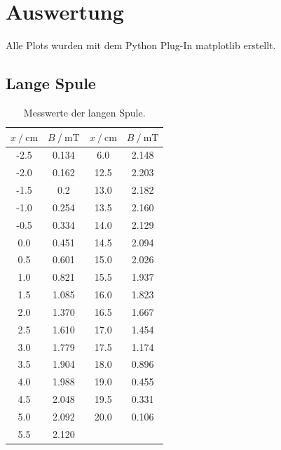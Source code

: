 \section{Auswertung}
\label{sec:Auswertung}
Alle Plots wurden mit dem Python Plug-In matplotlib \cite{matplotlib} erstellt.
\subsection{Lange Spule}

\FloatBarrier

\begin{table}
\centering
\caption{Messwerte der langen Spule.}
\begin{tabular}{cc|cc}
  \toprule
  $x \:/\: \si{\centi\meter}$ & $B \:/\: \si{\milli\tesla}$ & $x \:/\: \si{\centi\meter}$ & $B \:/\: \si{\milli\tesla}$ \\
  \midrule
  -2.5 & 0.134 &  6.0 & 2.148  \\
  -2.0 & 0.162 & 12.5 & 2.203 \\
  -1.5 & 0.2 &  13.0 & 2.182 \\
  -1.0 & 0.254 & 13.5 & 2.160 \\
  -0.5 & 0.334 &  14.0 & 2.129 \\ 
  0.0 & 0.451  & 14.5 & 2.094 \\
  0.5 & 0.601 & 15.0 & 2.026 \\
  1.0 & 0.821  & 15.5 & 1.937 \\
  1.5 & 1.085  & 16.0 & 1.823 \\
  2.0 & 1.370  & 16.5 & 1.667 \\
  2.5 & 1.610  &  17.0 & 1.454 \\
  3.0 & 1.779  & 17.5 & 1.174 \\
  3.5 & 1.904  & 18.0 & 0.896 \\
  4.0 & 1.988 & 19.0 & 0.455 \\
  4.5 & 2.048  &  19.5 & 0.331 \\
  5.0 & 2.092  & 20.0 & 0.106 \\
  5.5 & 2.120 & & \\
  \bottomrule
\end{tabular}
\label{tab:long}
\end{table}

